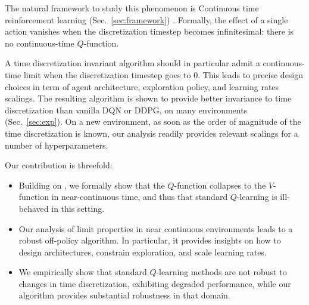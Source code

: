 The natural framework to study this phenomenon is Continuous time
reinforcement learning (Sec.~\ref{sec:framework}) \cite{cont_rl,
adv_upd}. Formally, the effect of a single action vanishes when the
discretization timestep becomes infinitesimal: there is no
continuous-time $Q$-function. 

 A time discretization invariant algorithm should  in particular admit a
continuous-time
limit when the discretization timestep goes to $0$.  This
leads to precise design choices in term of agent architecture, exploration
policy, and learning rates scalings.  The resulting algorithm is shown to
provide better invariance to time discretization than
vanilla DQN or DDPG, on many environments (Sec.~\ref{sec:exp}).  On a new environment, as soon as the
order of magnitude of the time discretization is known, our analysis readily
provides relevant scalings for a number of hyperparameters.


Our contribution is threefold:
\begin{itemize} 
\item Building on \cite{adv_upd}, we formally show that the $Q$-function collapses to the $V$-function in near-continuous time, and thus that
    standard $Q$-learning is ill-behaved in this setting.
  \item Our analysis of limit properties in near continuous environments leads to a robust off-policy algorithm. In particular,
    it provides insights on how to design architectures, constrain exploration, and scale learning rates.
  \item We empirically show that standard $Q$-learning methods are not
  robust to changes in time discretization, exhibiting degraded performance, while our algorithm provides
  substantial robustness in that domain. 
\end{itemize}


